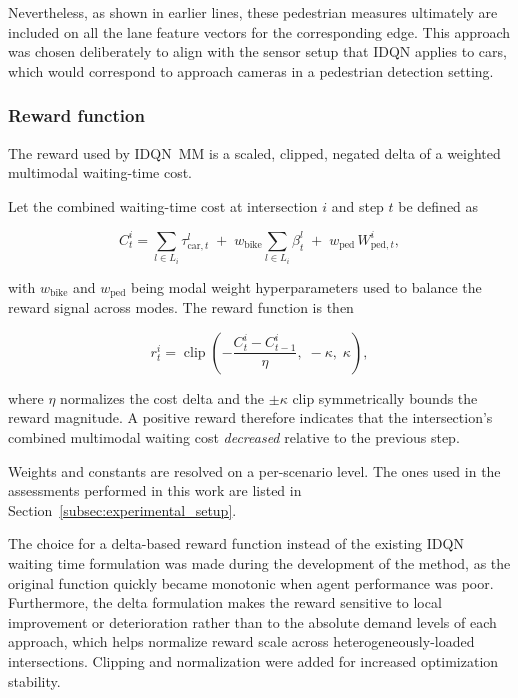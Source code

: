 Nevertheless, as shown in earlier lines, these pedestrian measures ultimately are included on all the lane feature vectors for the corresponding edge. This approach was chosen deliberately to align with the sensor setup that IDQN applies to cars, which would correspond to approach cameras in a pedestrian detection setting.
 
\subsubsection{Reward function} \label{subsubsec:idqnmm_reward}
 
The reward used by IDQN~MM is a scaled, clipped, negated delta of a weighted multimodal waiting-time cost.

Let the combined waiting-time cost at intersection $i$ and step $t$ be defined as

\begin{equation}
C_t^i = \sum_{l \in L_i} \tau_{\text{car},t}^l \;+\; w_{\text{bike}} \sum_{l \in L_i} \beta_t^l \;+\; w_{\text{ped}}\, W_{\text{ped},t}^i,
\end{equation}
 
\noindent with $w_{\text{bike}}$ and $w_{\text{ped}}$ being modal weight hyperparameters used to balance the reward signal across modes. The reward function is then
 
\begin{equation} \label{eq:idqnmm_reward}
r_t^i = \operatorname{clip}\!\left( -\frac{C_t^i - C_{t-1}^i}{\eta},\; -\kappa,\; \kappa \right),
\end{equation}

\noindent where $\eta$ normalizes the cost delta and the $\pm \kappa$ clip  symmetrically bounds the reward magnitude. A positive reward therefore indicates that the intersection's combined multimodal waiting cost \emph{decreased} relative to the previous step.

Weights and constants are resolved on a per-scenario level. The ones used in the assessments performed in this work are listed in Section~\ref{subsec:experimental_setup}.

The choice for a delta-based reward function instead of the existing IDQN waiting time formulation was made during the development of the method, as the original function quickly became monotonic when agent performance was poor. Furthermore, the delta formulation makes the reward sensitive to local improvement or deterioration rather than to the absolute demand levels of each approach, which helps normalize reward scale across heterogeneously-loaded intersections. Clipping and normalization were added for increased optimization stability.
 
